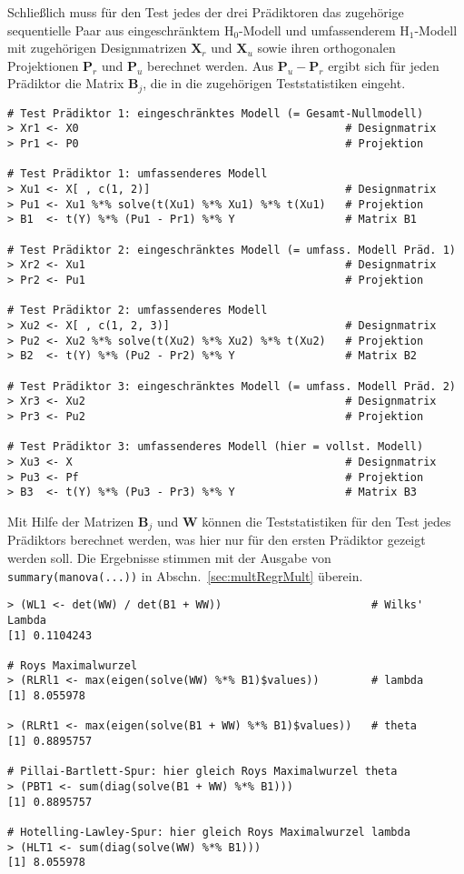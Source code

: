 Schließlich muss für den Test jedes der drei Prädiktoren das zugehörige sequentielle Paar aus eingeschränktem $\text{H}_{0}$-Modell und umfassenderem $\text{H}_{1}$-Modell mit zugehörigen Designmatrizen $\bm{X}_{r}$ und $\bm{X}_{u}$ sowie ihren orthogonalen Projektionen $\bm{P}_{r}$ und $\bm{P}_{u}$ berechnet werden. Aus $\bm{P}_{u} - \bm{P}_{r}$ ergibt sich für jeden Prädiktor die Matrix $\bm{B}_{j}$, die in die zugehörigen Teststatistiken eingeht.
\begin{lstlisting}
# Test Prädiktor 1: eingeschränktes Modell (= Gesamt-Nullmodell)
> Xr1 <- X0                                         # Designmatrix
> Pr1 <- P0                                         # Projektion

# Test Prädiktor 1: umfassenderes Modell
> Xu1 <- X[ , c(1, 2)]                              # Designmatrix
> Pu1 <- Xu1 %*% solve(t(Xu1) %*% Xu1) %*% t(Xu1)   # Projektion
> B1  <- t(Y) %*% (Pu1 - Pr1) %*% Y                 # Matrix B1

# Test Prädiktor 2: eingeschränktes Modell (= umfass. Modell Präd. 1)
> Xr2 <- Xu1                                        # Designmatrix
> Pr2 <- Pu1                                        # Projektion

# Test Prädiktor 2: umfassenderes Modell
> Xu2 <- X[ , c(1, 2, 3)]                           # Designmatrix
> Pu2 <- Xu2 %*% solve(t(Xu2) %*% Xu2) %*% t(Xu2)   # Projektion
> B2  <- t(Y) %*% (Pu2 - Pr2) %*% Y                 # Matrix B2

# Test Prädiktor 3: eingeschränktes Modell (= umfass. Modell Präd. 2)
> Xr3 <- Xu2                                        # Designmatrix
> Pr3 <- Pu2                                        # Projektion

# Test Prädiktor 3: umfassenderes Modell (hier = vollst. Modell)
> Xu3 <- X                                          # Designmatrix
> Pu3 <- Pf                                         # Projektion
> B3  <- t(Y) %*% (Pu3 - Pr3) %*% Y                 # Matrix B3
\end{lstlisting}

Mit Hilfe der Matrizen $\bm{B}_{j}$ und $\bm{W}$ können die Teststatistiken für den Test jedes Prädiktors berechnet werden, was hier nur für den ersten Prädiktor gezeigt werden soll. Die Ergebnisse stimmen mit der Ausgabe von \lstinline!summary(manova(...))! in Abschn.\ \ref{sec:multRegrMult} überein.
\begin{lstlisting}
> (WL1 <- det(WW) / det(B1 + WW))                       # Wilks' Lambda
[1] 0.1104243

# Roys Maximalwurzel
> (RLRl1 <- max(eigen(solve(WW) %*% B1)$values))        # lambda
[1] 8.055978

> (RLRt1 <- max(eigen(solve(B1 + WW) %*% B1)$values))   # theta
[1] 0.8895757

# Pillai-Bartlett-Spur: hier gleich Roys Maximalwurzel theta
> (PBT1 <- sum(diag(solve(B1 + WW) %*% B1)))
[1] 0.8895757

# Hotelling-Lawley-Spur: hier gleich Roys Maximalwurzel lambda
> (HLT1 <- sum(diag(solve(WW) %*% B1)))
[1] 8.055978
\end{lstlisting}

